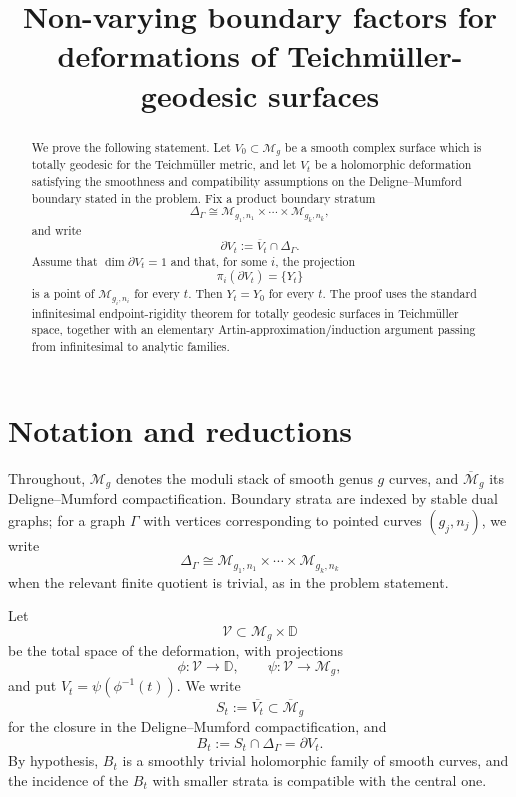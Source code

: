 \documentclass[11pt]{article}
\title{Non-varying boundary factors for deformations of Teichm\"uller-geodesic surfaces}
\author{}
\date{}
\theoremstyle{plain}
\theoremstyle{definition}
\newcommand{\M}{\mathcal M}
\newcommand{\bM}{\overline{\M}}
\newcommand{\D}{\mathbb D}
\newcommand{\cV}{\mathcal V}
\begin{document}
\maketitle

\begin{abstract}
We prove the following statement.  Let \(V_{0}\subset \M_{g}\) be a smooth complex surface which is totally geodesic for the Teichm\"uller metric, and let \(V_{t}\) be a holomorphic deformation satisfying the smoothness and compatibility assumptions on the Deligne--Mumford boundary stated in the problem.  Fix a product boundary stratum
\[
\Delta_{\Gamma}\cong \M_{g_{1},n_{1}}\times\cdots\times \M_{g_{k},n_{k}},
\]
and write
\[
\partial V_{t}:=\overline V_{t}\cap \Delta_{\Gamma}.
\]
Assume that \(\dim \partial V_{t}=1\) and that, for some \(i\), the projection
\[
\pi_{i}(\partial V_{t})=\{Y_{t}\}
\]
is a point of \(\M_{g_{i},n_{i}}\) for every \(t\).  Then \(Y_{t}=Y_{0}\) for every \(t\).  The proof uses the standard infinitesimal endpoint-rigidity theorem for totally geodesic surfaces in Teichm\"uller space, together with an elementary Artin-approximation/induction argument passing from infinitesimal to analytic families.
\end{abstract}

\tableofcontents

\section{Notation and reductions}

Throughout, \(\M_{g}\) denotes the moduli stack of smooth genus \(g\) curves, and \(\bM_{g}\) its Deligne--Mumford compactification.  Boundary strata are indexed by stable dual graphs; for a graph \(\Gamma\) with vertices corresponding to pointed curves \((g_{j},n_{j})\), we write
\[
\Delta_{\Gamma}\cong \M_{g_{1},n_{1}}\times \cdots \times \M_{g_{k},n_{k}}
\]
when the relevant finite quotient is trivial, as in the problem statement.

Let
\[
\cV\subset \M_{g}\times \D
\]
be the total space of the deformation, with projections
\[
\phi:\cV\to \D,\qquad \psi:\cV\to \M_{g},
\]
and put \(V_{t}=\psi(\phi^{-1}(t))\).  We write
\[
S_{t}:=\overline{V_{t}}\subset \bM_{g}
\]
for the closure in the Deligne--Mumford compactification, and
\[
B_{t}:=S_{t}\cap \Delta_{\Gamma}=\partial V_{t}.
\]
By hypothesis, \(B_{t}\) is a smoothly trivial holomorphic family of smooth curves, and the incidence of the \(B_{t}\) with smaller strata is compatible with the central one.
\end{document}
